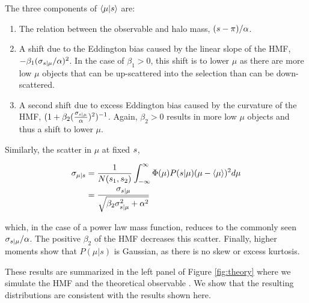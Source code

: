 \documentclass[a4paper,fleqn,usenatbib]{mnras}
\begin{document}
    \noindent The three components of $\langle \mu | s \rangle$ are: 
    
    \begin{enumerate}
    	
        \item The relation between the observable and halo mass, $(s- \pi) /
        \alpha$.
        
        \item A shift due to the Eddington bias caused by the linear slope of the HMF, $-\beta_1
        (\sigma_{s{} | \mu{}} / \alpha)^2$. In the case of $\beta_1 > 0$, this shift is to lower
        $\mu$ as there are more low $\mu$ objects that can be up-scattered into the selection
        than can be down-scattered.
        
        \item A second shift due to excess Eddington bias caused by the curvature of the HMF, $(1
        + \beta_2 (\frac{\sigma_{s{} | \mu{}}}{\alpha})^2)^{-1}$. Again, $\beta_2 > 0$ results in
        more low $\mu$ objects and thus a shift to lower $\mu$.
    	
    \end{enumerate}
    
    Similarly, the scatter in $\mu$ at fixed $s$,

    \begin{equation}
    \begin{aligned}
        \sigma_{\mu{} | s{}}{} 
        &= \frac{1}{N(s_1, s_2)}
            \int_{-\infty}^{\infty} \Phi(\mu){} P(s{} | \mu) ( \mu  - \langle \mu \rangle )^2 d\mu \\
    	&= \frac{\sigma_{s{} | \mu{}}}{\sqrt{\beta_2 \sigma_{s{} | \mu{}}^2 + \alpha^2}}
        \label{eq:scatter_of_mu}
    \end{aligned}
    \end{equation}
    
    \noindent which, in the case of a power law mass function, reduces to the commonly seen
    $\sigma_{s{} | \mu{}} / \alpha$. The positive $\beta_2$ of the HMF decreases this scatter.
    Finally, higher moments show that $P(\mu | s)$ is Gaussian, as there is no skew or excess
    kurtosis.
    
    These results are summarized in the left panel of Figure \ref{fig:theory} where we simulate
    the HMF and the theoretical observable \obsSym{}. We show that the resulting distributions
    are consistent with the results shown here.
    
\end{document}
